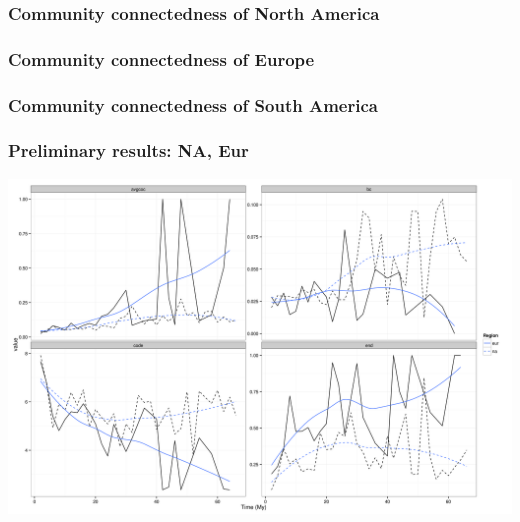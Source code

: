 \documentclass{beamer} \usepackage{amsmath,amsthm}
\begin{document}
\begin{frame}
  \frametitle{Community connectedness of North America}
\end{frame}

\begin{frame}
  \frametitle{Community connectedness of Europe}
\end{frame}

\begin{frame}
  \frametitle{Community connectedness of South America}
\end{frame}


\begin{frame}
  \frametitle{Preliminary results: NA, Eur}
  
  \begin{center}
    \includegraphics[height = 0.8\textheight, width = \textwidth, keepaspectratio = true]{figure/gen_bin}
  \end{center}
\end{frame}
\end{document}
